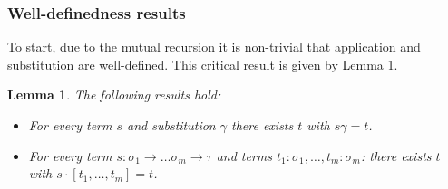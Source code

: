 \documentclass{lmcs}
\theoremstyle{theorem}\newtheorem{theorem}{Theorem}
\theoremstyle{theorem}\newtheorem{lemma}[theorem]{Lemma}
\theoremstyle{theorem}\newtheorem{corollary}[theorem]{Corollary}
\theoremstyle{definition}\newtheorem{definition}[theorem]{Definition}
\theoremstyle{definition}\newtheorem{example}[theorem]{Example}
\newcommand{\atype}{\sigma}
\newcommand{\btype}{\tau}
\newcommand{\arrtype}{\rightarrow}
\newcommand{\mysubsection}[1]{\vspace{-12pt}\subsubsection{#1}}
\begin{document}
\mysubsection{Well-definedness results}
To start, due to the mutual recursion it is non-trivial that application and substitution are
well-defined.  This critical result is given by Lemma \ref{lem:substdefined}.

\begin{lemma}\label{lem:substdefined}
The following results hold:
\begin{itemize}
\item For every term $s$ and substitution $\gamma$ there exists $t$ with $s\gamma = t$.
\item For every term $s : \atype_1 \arrtype \dots \atype_m \arrtype \btype$ and terms
  $t_1 : \atype_1,\dots,t_m : \atype_m$: there exists $t$ with $s \cdot [t_1,\dots,t_m] = t$.
\end{itemize}
\end{lemma}
\end{document}
